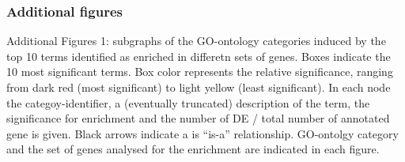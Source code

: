 \documentclass[10pt]{bmc_article}
\newenvironment{bmcformat}{\begin{raggedright}\baselineskip20pt\sloppy\setboolean{publ}{false}}{\end{raggedright}\baselineskip20pt\sloppy}
\begin{document}
\begin{bmcformat}
\subsubsection*{Additional figures}
Additional Figures 1: subgraphs of the GO-ontology categories induced
by the top 10 terms identified as enriched in differetn sets of
genes. Boxes indicate the 10 most significant terms. Box color
represents the relative significance, ranging from dark red (most
significant) to light yellow (least significant). In each node the
categoy-identifier, a (eventually truncated) description of the term,
the significance for enrichment and the number of DE / total number of
annotated gene is given. Black arrows indicate a is ``is-a''
relationship. GO-ontolgy category and the set of genes analysed for
the enrichment are indicated in each figure.

\end{bmcformat}
\end{document}

